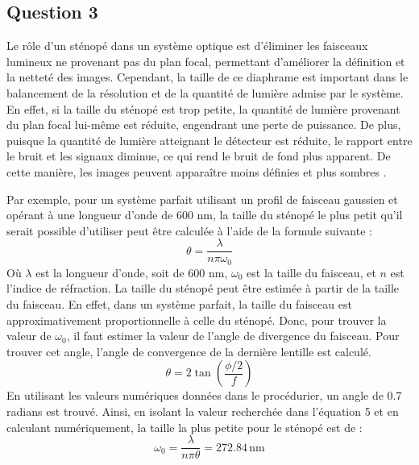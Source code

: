 \documentclass[11pt,letterpaper]{article}
\begin{document}
\subsection{Question 3}
Le rôle d'un sténopé dans un système optique est d'éliminer les faisceaux lumineux ne provenant pas du plan focal, permettant d'améliorer la définition et la netteté des images. Cependant, la taille de ce diaphrame est important dans le balancement de la résolution et de la quantité de lumière admise par le système. En effet, si la taille du sténopé est trop petite, la quantité de lumière provenant du plan focal lui-même est réduite, engendrant une perte de puissance. De plus, puisque la quantité de lumière atteignant le détecteur est réduite, le rapport entre le bruit et les signaux diminue, ce qui rend le bruit de fond plus apparent. De cette manière, les images peuvent apparaître moins définies et plus sombres \cite{semwogerere_confocal_2005}. 

Par exemple, pour un système parfait utilisant un profil de faisceau gaussien et opérant à une longueur d'onde de 600 nm, la taille du sténopé le plus petit qu'il serait possible d'utiliser peut être calculée à l'aide de la formule suivante \cite{noauthor_gaussian_2024} :
\begin{equation}
  \theta=\frac{\lambda}{n\pi\omega_{0}}
\end{equation}
Où $\lambda$ est la longueur d'onde, soit de 600 nm, $\omega_{0}$ est la taille du faisceau, et $n$ est l'indice de réfraction. La taille du sténopé peut être estimée à partir de la taille du faisceau. En effet, dans un système parfait, la taille du faisceau est approximativement proportionnelle à celle du sténopé. Donc, pour trouver la valeur de $\omega_0$, il faut estimer la valeur de l'angle de divergence du faisceau. Pour trouver cet angle, l'angle de convergence de la dernière lentille est calculé.
\begin{equation}
  \theta=2\tan\left(\frac{\phi/2}{f}\right)
\end{equation}
En utilisant les valeurs numériques données dans le procédurier, un angle de 0.7 radians est trouvé. Ainsi, en isolant la valeur recherchée dans l'équation 5 et en calculant numériquement, la taille la plus petite pour le sténopé est de :
\begin{equation}
  \omega_{0}=\frac{\lambda}{n\pi\theta}=272.84\,\mathrm{nm}
\end{equation}
\end{document}
